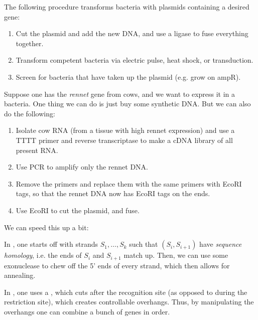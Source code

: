 \begin{exper}
	The following procedure transforms bacteria with plasmids containing a desired gene:
	\begin{enumerate}
		\item Cut the plasmid and add the new DNA, and use a ligase to fuse everything together.
		\item Transform competent bacteria via electric pulse, heat shock, or transduction.
		\item Screen for bacteria that have taken up the plasmid (e.g. grow on ampR).
	\end{enumerate}
\end{exper}

\begin{exper}
	Suppose one has the \emph{rennet} gene from cows, and we want to express it in a bacteria.
	One thing we can do is just buy some synthetic DNA.
	But we can also do the following:
	\begin{enumerate}
		\item Isolate cow RNA (from a tissue with high rennet expression) and use a TTTT primer and reverse transcriptase to make a cDNA library of all present RNA.
		\item Use PCR to amplify only the rennet DNA.
		\item Remove the primers and replace them with the same primers with EcoRI tags, so that the rennet DNA now has EcoRI tags on the ends.
		\item Use EcoRI to cut the plasmid, and fuse. 
	\end{enumerate}
\end{exper}

We can speed this up a bit:

\begin{exper}
	In , one starts off with strands $S_1,\ldots, S_k$ such that $(S_i, S_{i+1})$ have \emph{sequence homology}, i.e. the ends of $S_i$ and $S_{i+1}$ match up. Then, we can use some exonuclease to chew off the 5' ends of every strand, which then allows for annealing.
\end{exper}

\begin{exper}
	In , one uses a , which cuts after the recognition site (as opposed to during the restriction site), which creates controllable overhangs. Thus, by manipulating the overhangs one can combine a bunch of genes in order.  
\end{exper}
